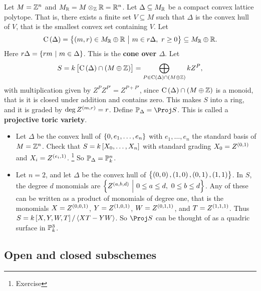 \pagebreak

\begin{example*}
Let $ M = \mathbb{Z}^n $ and $ M_{\mathbb{R}} = M \otimes_{\mathbb{Z}} \mathbb{R} = \mathbb{R}^n $. Let $ \Delta \subseteq M_{\mathbb{R}} $ be a compact convex lattice polytope. That is, there exists a finite set $ V \subseteq M $ such that $ \Delta $ is the convex hull of $ V $, that is the smallest convex set containing $ V $. Let
$$ \C\br{\Delta} = \cbr{\br{m, r} \in M_\RR \oplus \RR \st m \in r\Delta, \ r \ge 0} \subseteq M_\RR \oplus \RR. $$
Here $ r\Delta = \cbr{rm \st m \in \Delta} $. This is the \textbf{cone over $ \Delta $}. Let
$$ S = k\sbr{\C\br{\Delta} \cap \br{M \oplus \ZZ}} = \bigoplus_{P \in \C\br{\Delta} \cap \br{M \oplus \ZZ}} kZ^P, $$
with multiplication given by $ Z^PZ^{P'} = Z^{P + P'} $, since $ \C\br{\Delta} \cap \br{M \oplus \ZZ} $ is a monoid, that is it is closed under addition and contains zero. This makes $ S $ into a ring, and it is graded by $ \deg Z^{\br{m, r}} = r $. Define $ \PP_\Delta = \Proj S $. This is called a \textbf{projective toric variety}.
\begin{itemize}
\item Let $ \Delta $ be the convex hull of $ \cbr{0, e_1, \dots, e_n} $ with $ e_1, \dots, e_n $ the standard basis of $ M = \mathbb{Z}^n $. Check that $ S = k\sbr{X_0, \dots, X_n} $ with standard grading $ X_0 = Z^{\br{0, 1}} $ and $ X_i = Z^{\br{e_i, 1}} $. \footnote{Exercise} So $ \mathbb{P}_\Delta = \mathbb{P}_k^n $.
\item Let $ n = 2 $, and let $ \Delta $ be the convex hull of $ \cbr{\br{0, 0}, \br{1, 0}, \br{0, 1}, \br{1, 1}} $. In $ S $, the degree $ d $ monomials are $ \cbr{Z^{\br{a, b, d}} \st 0 \le a \le d, \ 0 \le b \le d} $. Any of these can be written as a product of monomials of degree one, that is the monomials $ X = Z^{\br{0, 0, 1}} $, $ Y = Z^{\br{1, 0, 1}} $, $ W = Z^{\br{0, 1, 1}} $, and $ T = Z^{\br{1, 1, 1}} $. Thus $ S = k\sbr{X, Y, W, T} / \abr{XT - YW} $. So $ \Proj S $ can be thought of as a quadric surface in $ \mathbb{P}_k^3 $.
\end{itemize}
\end{example*}

\subsection{Open and closed subschemes}


